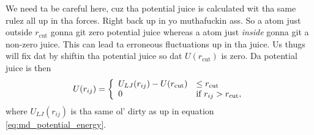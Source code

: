 We need ta be careful here, cuz tha potential juice is calculated wit tha same rulez all up in tha forces. Right back up in yo muthafuckin ass. So a atom just outside $r_\text{cut}$ gonna git zero potential juice whereas a atom just \textit{inside} gonna git a non-zero juice. This can lead ta erroneous fluctuations up in tha juice. Us thugs will fix dat by shiftin tha potential juice so dat $U(r_\text{cut})$ is zero. Da potential juice is then 
\begin{align}
	U(r_{ij}) = \left\{
	\begin{array}{l l}
		 U_{LJ}(r_{ij}) - U(r_\text{cut}) & \leq r_\text{cut}\\
		0 & \text{if } r_{ij} > r_\text{cut},
	\end{array}\right .
\end{align}
where $U_{LJ}(r_{ij})$ is tha same ol' dirty as up in equation \ref{eq:md_potential_energy}. 